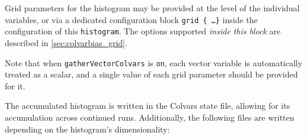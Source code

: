 Grid parameters for the histogram may be provided at the level of the individual variables, or via a dedicated configuration block \texttt{grid \{ \ldots \}} inside the configuration of this \texttt{histogram}.
The options supported \emph{inside this block} are described in \ref{sec:colvarbias_grid}.

Note that when \texttt{gatherVectorColvars} is \texttt{on}, each vector variable is automatically treated as a scalar, and a single value of each grid parameter should be provided for it.



The accumulated histogram is written in the Colvars state file, allowing for its accumulation across continued runs.  Additionally, the following files are written depending on the histogram's dimensionality:

